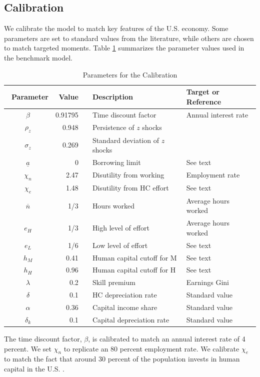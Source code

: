 \documentclass[12pt,english]{article}
\numberwithin{equation}{section}
\begin{document}
\subsection{Calibration \protect\label{sec:calib}}

We calibrate the model to match key features of the U.S. economy. Some parameters are set to standard values from the literature, while others are chosen to match targeted moments. Table \ref{tbl:para} summarizes
the parameter values used in the benchmark model.

\begin{table}
\noindent{}%
\noindent\begin{minipage}[t]{1\columnwidth}%
\begin{center}
\caption{\protect\label{tbl:para}Parameters for the Calibration}

\begin{tabular}{crrll}
\toprule 
~Parameter  & Value  &  & Description  & Target or Reference\tabularnewline
\midrule 
$\beta$  & 0.91795 &  & Time discount factor  & Annual interest rate\tabularnewline
$\rho_{z}$  & 0.948  &  & Persistence of $z$ shocks  & \citet{Chang2006}\tabularnewline
$\sigma_{z}$  & 0.269  &  & Standard deviation of $z$ shocks  & \citet{Chang2006}\tabularnewline
$\underline{a}$  & 0  &  & Borrowing limit  & See text\tabularnewline
$\chi_{n}$  & 2.47  &  & Disutility from working  & Employment rate\tabularnewline
$\chi_{e}$  & 1.48  &  & Disutility from HC effort  & See text\tabularnewline
$\overline{n}$  & 1/3  &  & Hours worked  & Average hours worked\tabularnewline
$e_{H}$  & 1/3  &  & High level of effort  & Average hours worked\tabularnewline
$e_{L}$  & 1/6  &  & Low level of effort  & See text\tabularnewline
$h_{M}$  & 0.41  &  & Human capital cutoff for M  & See text\tabularnewline
$h_{H}$  & 0.96  &  & Human capital cutoff for H  & See text\tabularnewline
$\lambda$  & 0.2  &  & Skill premium  & Earnings Gini\tabularnewline
$\delta$  & 0.1  &  & HC depreciation rate & Standard value\tabularnewline
$\alpha$  & 0.36  &  & Capital income share  & Standard value\tabularnewline
$\delta_k$  & 0.1  &  & Capital depreciation rate  & Standard value\tabularnewline
\bottomrule
\end{tabular}
\par\end{center}%
\end{minipage}
\end{table}

The time discount factor, $\beta$, is calibrated to match an annual
interest rate of 4 percent. We set $\chi_{n}$ to replicate an 80
percent employment rate. We calibrate $\chi_{e}$ to match the fact
that around 30 percent of the population invests in human capital in the U.S. \citep{oecd2025adultlearning}.
\end{document}
